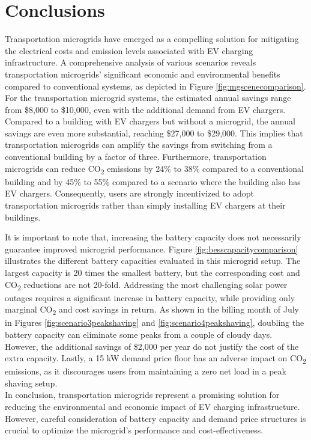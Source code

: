\documentclass[conference]{IEEEtran}
\begin{document}
	\section{Conclusions}
		Transportation microgrids have emerged as a compelling solution for mitigating the electrical costs and emission levels associated with EV charging infrastructure. A comprehensive analysis of various scenarios reveals transportation microgrids' significant economic and environmental benefits compared to conventional systems, as depicted in Figure \ref{fig:mgscenecomparison}. For the transportation microgrid systems, the estimated annual savings range from \$8,000 to \$10,000, even with the additional demand from EV chargers. Compared to a building with EV chargers but without a microgrid, the annual savings are even more substantial, reaching \$27,000 to \$29,000. This implies that transportation microgrids can amplify the savings from switching from a conventional building by a factor of three. Furthermore, transportation microgrids can reduce CO\textsubscript{2} emissions by 24\% to 38\% compared to a conventional building and by 45\% to 55\% compared to a scenario where the building also has EV chargers. Consequently, users are strongly incentivized to adopt transportation microgrids rather than simply installing EV chargers at their buildings. 
		
		It is important to note that, increasing the battery capacity does not necessarily guarantee improved microgrid performance. Figure \ref{fig:besscapacitycomparison} illustrates the different battery capacities evaluated in this microgrid setup. The largest capacity is 20 times the smallest battery, but the corresponding cost and CO\textsubscript{2} reductions are not 20-fold. Addressing the most challenging solar power outages requires a significant increase in battery capacity, while providing only marginal CO\textsubscript{2} and cost savings in return. As shown in the billing month of July in Figures \ref{fig:scenario3peakshaving} and \ref{fig:scenario4peakshaving}, doubling the battery capacity can eliminate some peaks from a couple of cloudy days. However, the additional savings of \$2,000 per year do not justify the cost of the extra capacity. Lastly, a 15 kW demand price floor has an adverse impact on CO\textsubscript{2} emissions, as it discourages users from maintaining a zero net load in a peak shaving setup. \\
		
		In conclusion, transportation microgrids represent a promising solution for reducing the environmental and economic impact of EV charging infrastructure. However, careful consideration of battery capacity and demand price structures is crucial to optimize the microgrid's performance and cost-effectiveness.
\end{document}
